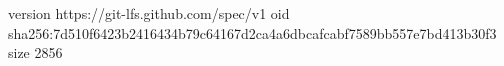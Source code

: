 version https://git-lfs.github.com/spec/v1
oid sha256:7d510f6423b2416434b79c64167d2ca4a6dbcafcabf7589bb557e7bd413b30f3
size 2856
